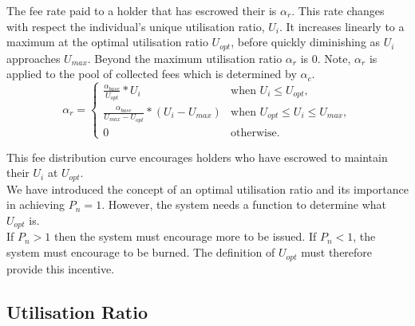 \noindent The fee rate paid to a \HAV{} holder that has escrowed their \HAV{} is $\alpha_r$. This rate changes with respect the individual's unique utilisation ratio, $U_i$. It increases linearly to a maximum at the optimal utilisation ratio $U_{opt}$, before quickly diminishing as $U_i$ approaches $U_{max}$. Beyond the maximum utilisation ratio $\alpha_r$ is 0. Note, $\alpha_r$ is applied to the pool of collected fees which is determined by $\alpha_c$. \\

\[
\alpha_r = 
\begin{cases}
 \frac{\alpha_{base}}{U_{opt}} * U_i &\mbox{when } U_i \leq U_{opt}, \\[1em]
 \frac{\alpha_{base}}{U_{max} - U_{opt}} * (U_i  - U_{max}) &\mbox{when } U_{opt} \leq U_i \leq U_{max}, \\[1em]
 0 &\mbox{otherwise}.
 \end{cases}
\]


\noindent This fee distribution curve encourages \HAV{} holders who have escrowed to maintain their $U_i$ at $U_{opt}$.  \\

\noindent We have introduced the concept of an optimal utilisation ratio and its importance in achieving $P_n = 1$. However, the system needs a function to determine what $U_{opt}$ is. \\

\noindent If $P_n > 1$ then the system must encourage more \NOM{} to be issued. If $P_n < 1$, the system must encourage \NOM{} to be burned. The definition of $U_{opt}$ must therefore provide this incentive.

\newpage
\subsection{Utilisation Ratio}
